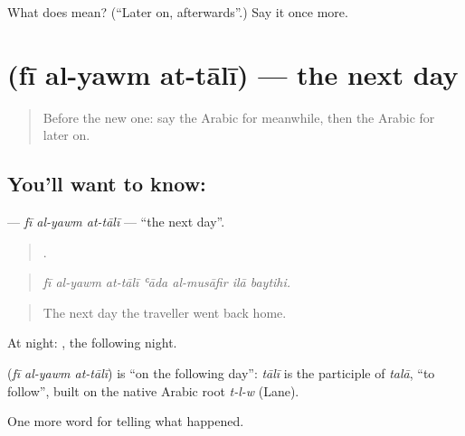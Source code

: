 \begin{tcolorbox}[breakable,colback=teal!4,colframe=teal!35!black,title={Before you move on}]
What does   mean? (\textquotedblleft{}Later on, afterwards\textquotedblright{}.) Say it once more.
\end{tcolorbox}
\section[\texorpdfstring{\ar{في} \ar{اليوم} \ar{التالي} (fī al-yawm at-tālī)}{في اليوم التالي (fī al-yawm at-tālī)}]{   (fī al-yawm at-tālī) — the next day}

\label{lesson:AR-C299-fi-al-yawm-at-tali}



\begin{quote}
Before the new one: say the Arabic for meanwhile, then the Arabic for later on.
\end{quote}

\subsection*{You'll want to know:   }
\textbf{  } — \emph{fī al-yawm at-tālī} — \textquotedblleft{}the next day\textquotedblright{}.

\begin{quote}
      .
\end{quote}

\begin{quote}
\emph{fī al-yawm at-tālī ʿāda al-musāfir ilā baytihi.}
\end{quote}

\begin{quote}
The next day the traveller went back home.
\end{quote}

At night:   , the following night.

\begin{cousinweb}
\textbf{  } (\emph{fī al-yawm at-tālī}) is \textquotedblleft{}on the following day\textquotedblright{}: \emph{tālī} is the participle of \emph{talā}, \textquotedblleft{}to follow\textquotedblright{}, built on the native Arabic root \emph{t-l-w} (Lane).
\end{cousinweb}

\begin{grammarlens}[title={What you've built}]
One more word for telling what happened.
\end{grammarlens}

